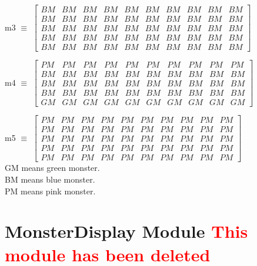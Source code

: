 \documentclass[12pt]{article}
\begin{document}
\vspace{1cm}
\noindent 
m3 $\equiv$ 
$
\begin{bmatrix}
BM & BM & BM & BM & BM & BM & BM & BM & BM & BM \\
BM & BM & BM & BM & BM & BM & BM & BM & BM & BM \\
BM & BM & BM & BM & BM & BM & BM & BM & BM & BM \\
BM & BM & BM & BM & BM & BM & BM & BM & BM & BM \\
BM & BM & BM & BM & BM & BM & BM & BM & BM & BM 
\end{bmatrix}
$

\vspace{1cm}
\noindent 
m4 $\equiv$ 
$
\begin{bmatrix}
PM & PM & PM & PM & PM & PM & PM & PM & PM & PM \\
BM & BM & BM & BM & BM & BM & BM & BM & BM & BM \\
BM & BM & BM & BM & BM & BM & BM & BM & BM & BM \\
BM & BM & BM & BM & BM & BM & BM & BM & BM & BM \\
GM & GM & GM & GM & GM & GM & GM & GM & GM & GM 
\end{bmatrix}
$

\vspace{1cm}
\noindent 
m5 $\equiv$ 
$
\begin{bmatrix}
PM & PM & PM & PM & PM & PM & PM & PM & PM & PM \\
PM & PM & PM & PM & PM & PM & PM & PM & PM & PM \\
PM & PM & PM & PM & PM & PM & PM & PM & PM & PM \\
PM & PM & PM & PM & PM & PM & PM & PM & PM & PM \\
PM & PM & PM & PM & PM & PM & PM & PM & PM & PM 
\end{bmatrix}
$
\\

\noindent GM means green monster.\\ BM means blue monster.\\ PM means pink monster.
\newpage


\section{MonsterDisplay Module \textcolor{red}{This module has been deleted}}
\end{document}
